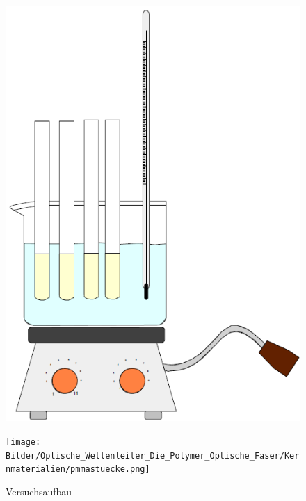 \begin{figure}[h]
    \begin{center}
        \begin{minipage}[t]{0.3\textwidth}
            \begin{center}
                \includegraphics[height=0.1\textheight]{Bilder/Optische_Wellenleiter_Die_Polymer_Optische_Faser/Kernmaterialien/mmawasserbad.png}
                \caption[Versuchsaufbau]{Versuchsaufbau}
                \label{fig:mmawasserbad}
            \end{center}
        \end{minipage}
        \hspace{0.025\textwidth}
        \begin{minipage}[t]{0.3\textwidth}
            \begin{center}
                \texttt{[image: Bilder/Optische\_Wellenleiter\_Die\_Polymer\_Optische\_Faser/Kernmaterialien/pmmastuecke.png]}

\end{center}
\end{minipage}
\end{center}
\end{figure}
